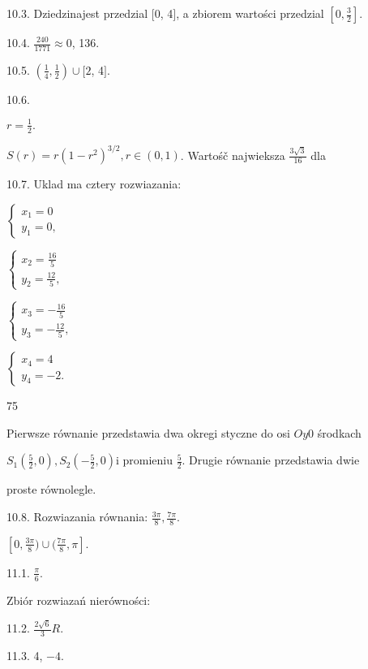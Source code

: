 \documentclass[a4paper,12pt]{article}
\begin{document}
10.3. Dziedzinajest przedzial $[0$, 4$]$, a zbiorem wartości przedzial $[0,\displaystyle \frac{3}{2}].$

10.4. $\displaystyle \frac{240}{1771}\approx 0$, 136.

10.5. $(\displaystyle \frac{1}{4},\frac{1}{2})\cup[2$, 4$].$

10.6.

$r=\displaystyle \frac{1}{2}.$

$S(r) = r(1-r^{2})^{3/2}, r \in (0,1)$. Wartośč najwieksza $\displaystyle \frac{3\sqrt{3}}{16}$ dla

10.7. Uklad ma cztery rozwiazania:

$\left\{\begin{array}{l}
x_{1}=0\\
y_{1}=0,
\end{array}\right.$

$\left\{\begin{array}{l}
x_{2}=\frac{16}{5}\\
y_{2}=\frac{12}{5},
\end{array}\right.$

$\left\{\begin{array}{l}
x_{3}=-\frac{16}{5}\\
y_{3}=-\frac{12}{5},
\end{array}\right.$

$\left\{\begin{array}{l}
x_{4}=4\\
y_{4}=-2.
\end{array}\right.$





75

Pierwsze równanie przedstawia dwa okregi styczne do osi $Oy 0$ środkach

$S_{1}(\displaystyle \frac{5}{2},0), S_{2}(-\displaystyle \frac{5}{2},0) \mathrm{i}$ promieniu $\displaystyle \frac{5}{2}$. Drugie równanie przedstawia dwie

proste równolegle.

10.8. Rozwiazania równania: $\displaystyle \frac{3\pi}{8}, \displaystyle \frac{7\pi}{8}.$

$[0,\displaystyle \frac{3\pi}{8})\cup(\frac{7\pi}{8},\pi].$

11.1. $\displaystyle \frac{\pi}{6}.$

Zbiór rozwiazań nierówności:

11.2. $\displaystyle \frac{2\sqrt{6}}{3}R.$

11.3. 4, $-4.$
\end{document}
